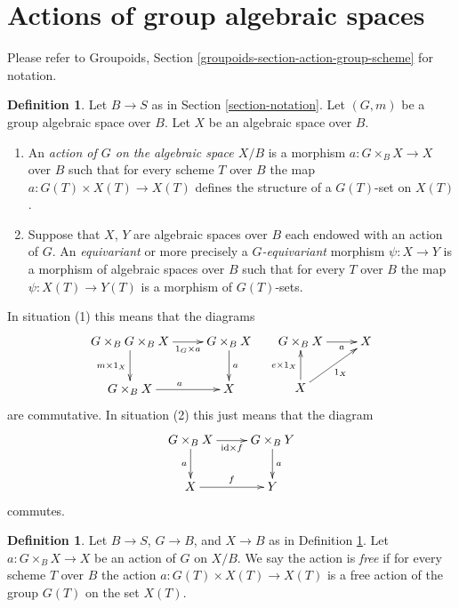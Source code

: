 \documentclass{stacks-project}
\theoremstyle{plain}
\theoremstyle{definition}
\newtheorem{definition}[subsection]{Definition}
\theoremstyle{remark}
\numberwithin{equation}{subsection}
\begin{document}
\section{Actions of group algebraic spaces}
\label{section-action-group-space}

\noindent
Please refer to
Groupoids, Section \ref{groupoids-section-action-group-scheme}
for notation.

\begin{definition}
\label{definition-action-group-space}
Let $B \to S$ as in Section \ref{section-notation}.
Let $(G, m)$ be a group algebraic space over $B$.
Let $X$ be an algebraic space over $B$.
\begin{enumerate}
\item An {\it action of $G$ on the algebraic space $X/B$} is
a morphism $a : G \times_B X \to X$ over $B$ such that
for every scheme $T$ over $B$ the map $a : G(T) \times X(T) \to X(T)$
defines the structure of a $G(T)$-set on $X(T)$.
\item Suppose that $X$, $Y$ are algebraic spaces over $B$ each endowed
with an action of $G$. An {\it equivariant} or more precisely
a {\it $G$-equivariant} morphism $\psi : X \to Y$
is a morphism of algebraic spaces over $B$ such
that for every $T$ over $B$ the map $\psi : X(T) \to Y(T)$ is
a morphism of $G(T)$-sets.
\end{enumerate}
\end{definition}

\noindent
In situation (1) this means that the diagrams
\begin{equation}
\label{equation-action}
\xymatrix{
G \times_B G \times_B X \ar[r]_-{1_G \times a} \ar[d]_{m \times 1_X} &
G \times_B X \ar[d]^a \\
G \times_B X \ar[r]^a & X
}
\quad
\xymatrix{
G \times_B X \ar[r]_-a & X \\
X\ar[u]^{e \times 1_X} \ar[ru]_{1_X}
}
\end{equation}
are commutative. In situation (2) this just means that the diagram
$$
\xymatrix{
G \times_B X \ar[r]_-{\text{id} \times f} \ar[d]_a &
G \times_B Y \ar[d]^a \\
X \ar[r]^f & Y
}
$$
commutes.

\begin{definition}
\label{definition-free-action}
Let $B \to S$, $G \to B$, and $X \to B$ as in
Definition \ref{definition-action-group-space}.
Let $a : G \times_B X \to X$ be an action of $G$ on $X/B$.
We say the action is {\it free} if for every scheme $T$ over $B$
the action $a : G(T) \times X(T) \to X(T)$ is a free action of
the group $G(T)$ on the set $X(T)$.
\end{definition}
\end{document}
